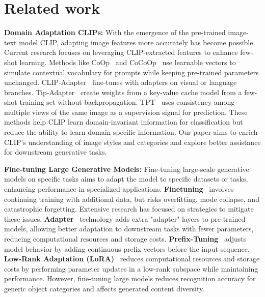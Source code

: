 \section{Related work}
\textbf{Domain Adaptation CLIPs:} With the emergence of the pre-trained image-text model CLIP, adapting image features more accurately has become possible. Current research focuses on leveraging CLIP-extracted features to enhance few-shot learning. Methods like CoOp~\cite{zhou2022learning} and CoCoOp~\cite{zhou2022conditional} use learnable vectors to simulate contextual vocabulary for prompts while keeping pre-trained parameters unchanged. CLIP-Adapter~\cite{gao2023clip} fine-tunes with adapters on visual or language branches. Tip-Adapter~\cite{zhang2021tip} create weights from a key-value cache model from a few-shot training set without backpropagation. TPT~\cite{shu2022test} uses consistency among multiple views of the same image as a supervision signal for prediction. These methods help CLIP learn domain-invariant information for classification but reduce the ability to learn domain-specific information. Our paper aims to enrich CLIP's understanding of image styles and categories and explore better assistance for downstream generative tasks.

\textbf{Fine-tuning Large Generative Models: }
Fine-tuning large-scale generative models on specific tasks aims to adapt the model to specific datasets or tasks, enhancing performance in specialized applications. \textbf{Finetuning}~\cite{kumar2022fine} involves continuing training with additional data, but risks overfitting, mode collapse, and catastrophic forgetting. Extensive research has focused on strategies to mitigate these issues. \textbf{Adapter}~\cite{chen2022vision} technology adds extra "adapter" layers to pre-trained models, allowing better adaptation to downstream tasks with fewer parameters, reducing computational resources and storage costs. \textbf{Prefix-Tuning}~\cite{li2021prefix} adjusts model behavior by adding continuous prefix vectors before the input sequence. \textbf{Low-Rank Adaptation (LoRA)}~\cite{hu2022lora} reduces computational resources and storage costs by performing parameter updates in a low-rank subspace while maintaining performance. However, fine-tuning large models reduces recognition accuracy for generic object categories and affects generated content diversity.